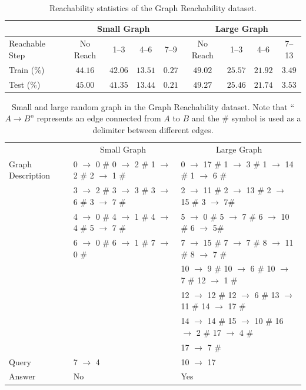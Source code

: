 \documentclass[sigconf]{acmart}
\begin{document}
\begin{table}[th]
	\centering
	{\small
		\caption{{Reachability statistics of the Graph Reachability dataset.}}
		\label{tab:statgraph}
		\vspace{-1mm}
		\begin{tabular}{l|cccccccc}
			\toprule
			& \multicolumn{4}{c}{Small Graph}  & \multicolumn{4}{c}{Large Graph}                \\
			\midrule
			Reachable Step & No Reach  &  1--3 & 4--6 & 7--9 & No Reach  &  1--3 & 4--6 & 7--13	\\\hline
			Train  ($\%$) 	  & $44.16$ &  $42.06$ & $13.51$  & $0.27$ & $49.02$ & $25.57$ & $21.92$  & $3.49$ \\
			Test   ($\%$)     & $45.00$ &  $41.35$ & $13.44$ & $0.21$ & $49.27$ &  $25.46$ & $21.74$  & $3.53$  \\
			
			\bottomrule
		\end{tabular}
	}
\end{table}
\begin{table}[ht]
	{\small
		\caption{{Small and large random graph in the Graph Reachability dataset. Note that ``$A \rightarrow B$'' represents an edge connected from $A$ to $B$ and the \# symbol is used as a delimiter between different edges.}}
		\vspace{-1mm}
		\label{tab:sample-graph}
		\centering
		\begin{tabular}{lll}
			\toprule
			& \multicolumn{1}{c}{Small Graph}  &   \multicolumn{1}{c}{Large Graph}               \\
			\cmidrule{1-3}
			Graph Description  
			& 0 $\rightarrow$ 0 \# 0 $\rightarrow$ 2 \# 1 $\rightarrow$ 2 \# 2 $\rightarrow$ 1 \# &  0 $\rightarrow$ 17 \#  1 $\rightarrow$ 3 \# 1 $\rightarrow$ 14 \# 1 $\rightarrow$ 6 \# \\ 
			& 3 $\rightarrow$ 2 \# 3 $\rightarrow$ 3 \# 3 $\rightarrow$ 6 \# 3 $\rightarrow$ 7 \# & 2 $\rightarrow$ 11 \#  2 $\rightarrow$ 13 \# 2 $\rightarrow$ 15 \# 3 $\rightarrow$ 7\# \\ 	        
			& 4 $\rightarrow$ 0 \# 4 $\rightarrow$ 1 \# 4 $\rightarrow$ 4 \# 5 $\rightarrow$ 7 \#  & 5 $\rightarrow$ 0  \#  5 $\rightarrow$ 7 \# 6 $\rightarrow$ 10 \# 6 $\rightarrow$ 5\# \\
			& 6 $\rightarrow$ 0 \# 6 $\rightarrow$ 1 \# 7 $\rightarrow$ 0 \#  &  7 $\rightarrow$ 15 \# 7 $\rightarrow$ 7 \# 8 $\rightarrow$ 11 \# 8 $\rightarrow$ 7 \# \\ 
			& & 10 $\rightarrow$ 9  \# 10 $\rightarrow$ 6 \# 10 $\rightarrow$ 7 \# 12 $\rightarrow$ 1 \#  \\ 
			& & 12 $\rightarrow$ 12 \# 12 $\rightarrow$ 6 \# 13 $\rightarrow$ 11 \# 14 $\rightarrow$ 17 \# \\ 
			& & 14 $\rightarrow$ 14  \# 15 $\rightarrow$ 10 \#  16 $\rightarrow$ 2 \# 17 $\rightarrow$ 4 \# \\ 
			& & 17 $\rightarrow$ 7 \#  \\
			\midrule
			Query &  7 $\rightarrow$ 4  & 10 $\rightarrow$ 17 \\\hline
			Answer     & No  & Yes \\
			\bottomrule
		\end{tabular}
	}
\end{table}
\end{document}
